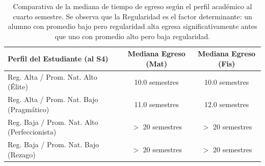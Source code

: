 
\begin{table}[H]
\centering
\small
\begin{tabular}{|l|c|c|}
\hline
\textbf{Perfil del Estudiante (al S4)} & \textbf{Mediana Egreso (Mat)} & \textbf{Mediana Egreso (Fis)} \\ \hline
Reg. Alta / Prom. Nat. Alto (Élite)    & 10.0 semestres              & 10.0 semestres              \\ \hline
Reg. Alta / Prom. Nat. Bajo (Pragmático) & 11.0 semestres              & 12.0 semestres              \\ \hline
Reg. Baja / Prom. Nat. Alto (Perfeccionista) & $>$ 20 semestres            & $>$ 20 semestres            \\ \hline
Reg. Baja / Prom. Nat. Bajo (Rezago)   & $>$ 20 semestres            & $>$ 20 semestres            \\ \hline
\end{tabular}
\caption{Comparativa de la mediana de tiempo de egreso según el perfil académico al cuarto semestre. Se observa que la Regularidad es el factor determinante: un alumno con promedio bajo pero regularidad alta egresa significativamente antes que uno con promedio alto pero baja regularidad.}
\label{tab:supervivencia_perfiles}
\end{table}
